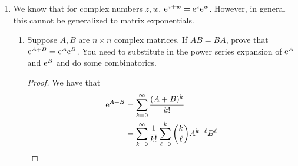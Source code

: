 \documentclass[../psets.tex]{subfiles}
\begin{document}
\begin{enumerate}
\begin{proof}
\begin{align*}
        \end{align*}
        where the left term in the RHS is a solution of the homogeneous equation, and the right term in the RHS is the integral of the product of the solution of the homogeneous equation with the given initial condition and $g(\tau)$, as desired.\par
        We will solve the particular case bit by bit, adding components together into a final solution. To begin, we have that
        \begin{align*}
            \dv{t}(\int_0^t\frac{\sin\omega(t-\tau)}{\omega}f(\tau)\dd\tau) &= \lim_{h\to 0}\frac{1}{h}
        \end{align*}
    \end{proof}
    \item We know that for complex numbers $z,w$, $\e[z+w]=\e[z]\e[w]$. However, in general this cannot be generalized to matrix exponentials.
    \begin{enumerate}
        \item Suppose $A,B$ are $n\times n$ complex matrices. If $AB=BA$, prove that $\e[A+B]=\e[A]\e[B]$. You need to substitute in the power series expansion of $\e[A]$ and $\e[B]$ and do some combinatorics.
        \begin{proof}
            We have that
            \begin{align*}
                \e[A+B] &= \sum_{k=0}^\infty\frac{(A+B)^k}{k!}\\
                &= \sum_{k=0}^\infty\frac{1}{k!}\sum_{\ell=0}^k\binom{k}{\ell}A^{k-\ell}B^\ell\\

\end{align*}
\end{proof}
\end{enumerate}
\end{enumerate}
\end{document}
